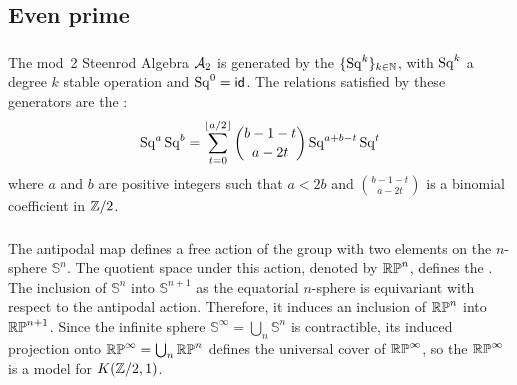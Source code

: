 %

\subsection{Even prime}

\subsubsection{} The mod~2 Steenrod Algebra $\mathcal{A}_2$ is generated by the  $\{\operatorname{Sq}^k\}_{k \in \mathbb{N}}$, with $\operatorname{Sq}^k$ a degree $k$ stable operation and $\operatorname{Sq}^0 = \mathsf{id}$.
The relations satisfied by these generators are the :
\[
\operatorname{Sq}^a \operatorname{Sq}^b = \sum_{t = 0}^{\lfloor a/2 \rfloor} \binom{b-1-t}{a-2t} \operatorname{Sq}^{a+b-t} \operatorname{Sq}^t
\]
where $a$ and $b$ are positive integers such that $a < 2b$ and \(\binom{b-1-t}{a-2t}\) is a binomial coefficient in $\mathbb{Z}/2$.

\subsubsection{}

The antipodal map defines a free action of the group with two elements on the $n$-sphere \(\mathbb{S}^n\).
The quotient space under this action, denoted by \(\mathbb{RP}^n\), defines the .
The inclusion of \(\mathbb{S}^n\) into \(\mathbb{S}^{n+1}\) as the equatorial $n$-sphere is equivariant with respect to the antipodal action.
Therefore, it induces an inclusion of \(\mathbb{RP}^n\) into \(\mathbb{RP}^{n+1}\).
Since the infinite sphere \(\mathbb{S}^\infty = \bigcup_n \mathbb{S}^n\) is contractible, its induced projection onto $\mathbb{RP}^\infty = \bigcup_n \mathbb{RP}^n$ defines the universal cover of \(\mathbb{RP}^\infty\), so the  $\mathbb{RP}^\infty$ is a model for \(K(\mathbb{Z}/2, 1)\).

